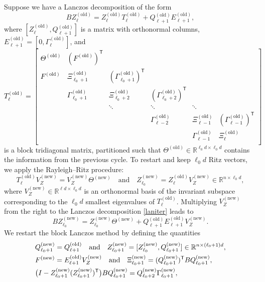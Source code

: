 \documentclass{siamart190516}
\newcommand{\Ttran}{\mathsf{T}}
\newcommand{\R}{\mathbb{R}}
\newcommand{\Ta}{\Xi}
\newcommand{\Tb}{\Gamma}
\newcommand{\old}{\mathrm{old}}
\newcommand{\new}{\mathrm{new}}
\newcommand{\edit}[1]{\textcolor{black}{#1}} %
\begin{document}
Suppose we have a Lanczos decomposition of the form
\begin{equation}
    \label{laniter}
    BZ_{\ell}^{(\old)} = Z_{\ell}^{(\old)}T_{\ell}^{(\old)}+Q_{\ell+1}^{(\old)}E_{\ell+1}^{(\old)},
\end{equation} 
where $[Z_{\ell}^{(\old)},Q_{\ell+1}^{(\old)}]$ is a matrix with orthonormal columns, $E_{\ell+1}^{(\old)}=[0,\Gamma_{\ell}^{(\old)}]$, and 
\edit{
\begin{equation}
    \label{defT}
    T_{\ell}^{(\old)} = \begin{bmatrix}
        \Theta^{(\old)} & (F^{(\old)})^{\Ttran} &&&&\\
        F^{(\old)} &\Ta_{\ell_{0}+1}^{(\old)} & (\Tb_{\ell_{0}+1}^{(\old)})^{\Ttran} & & &\\ 
        &\Tb_{\ell_{0}+1}^{(\old)} & \Ta_{\ell_{0}+2}^{(\old)} & (\Tb_{\ell_{0}+2}^{(\old)})^{\Ttran} & &\\ 
        && \ddots & \ddots & \ddots &\\ 
        &&&\Tb_{\ell-2}^{(\old)} & \Ta_{\ell-1}^{(\old)} & (\Tb_{\ell-1}^{(\old)})^{\Ttran}\\
        &&&&\Tb_{\ell-1}^{(\old)} & \Ta_{\ell}^{(\old)} \\
    \end{bmatrix}
\end{equation}}
is a block tridiagonal matrix, partitioned such that $\Theta^{(\old)} \in \R^{\ell_0 d \times \ell_0 d}$ contains the information from the previous cycle. To restart and keep $\ell_{0}d$ Ritz vectors, we apply the Rayleigh--Ritz procedure:
\begin{equation*}
    T_{\ell}^{(\old)}V_{Z}^{(\new)}=V_{Z}^{(\new)}\Theta^{(\new)} 
    \quad \text{and} \quad 
    Z_{\ell_{0}}^{(\new)} = Z_{\ell}^{(\old)}V_{Z}^{(\new)} \in \R^{n \times \ell_0 d},
\end{equation*}
where $V_{Z}^{(\new)} \in \R^{\ell d \times \ell_0 d}$ is an orthonormal basis of the invariant subspace corresponding to the $\ell_{0}d$ smallest eigenvalues of $T_{\ell}^{(\old)}$. Multiplying $V_{Z}^{(\new)}$ from the right to the Lanczos decomposition \cref{laniter} leads to 
\begin{equation*}
    BZ_{\ell_{0}}^{(\new)} = Z_{\ell_{0}}^{(\new)}\Theta^{(\new)}+Q_{\ell+1}^{(\old)}E_{\ell+1}^{(\old)}V_{Z}^{(\new)}.
\end{equation*} 
We restart the block Lanczos method by defining the quantities
\begin{equation*}
    \begin{aligned}
        &Q_{\ell_{0}+1}^{(\new)} = Q_{\ell+1}^{(\old)}
          \quad \text{and}\quad
        Z_{\ell_{0}+1}^{(\new)} = [Z_{\ell_{0}}^{(\new)},Q_{\ell_{0}+1}^{(\new)}] \in \R^{n\times (\ell_0+1) d},\\
        & \edit{F^{(\new)} = E_{\ell+1}^{(\old)}V_{Z}^{(\new)}}
        \quad\text{and}\quad 
        \Ta_{\ell_{0}+1}^{(\new)} = (Q_{\ell_{0}+1}^{(\new)})^{\Ttran}BQ_{\ell_{0}+1}^{(\new)},\\ 
        &\bigl(I-Z_{\ell_{0}+1}^{(\new)}(Z_{\ell_{0}+1}^{(\new)})^{\Ttran}\bigr)BQ_{\ell_{0}+1}^{(\new)} = Q_{\ell_{0}+2}^{(\new)}\Tb_{\ell_{0}+1}^{(\new)},
    \end{aligned}
\end{equation*}
\end{document}
